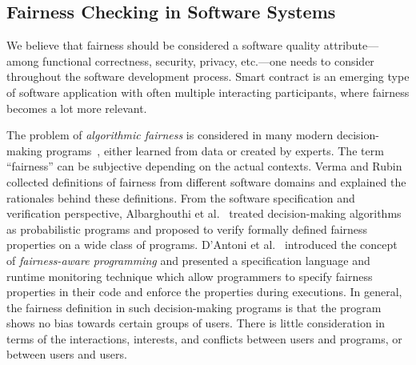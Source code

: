 
\subsection{Fairness Checking in Software Systems}

We believe that fairness should be considered a software quality attribute---among functional
correctness, security, privacy, etc.---one needs to consider throughout the software development
process.
Smart contract is an emerging type of software application with often multiple interacting
participants, where fairness becomes a lot more relevant.

The problem of \emph{algorithmic fairness} is considered in many modern decision-making
programs~\cite{zemel2013learning,datta2016algorithmic,Albarghouthi2017FairSquarePV}, either learned
from data or created by experts.
The term ``fairness'' can be subjective depending on the actual contexts.
Verma and Rubin~\cite{VR18} collected definitions of fairness from different software domains and
explained the rationales behind these definitions.
From the software specification and verification perspective, Albarghouthi et
al.~\cite{Albarghouthi2017FairSquarePV} treated decision-making algorithms as probabilistic programs
and proposed to verify formally defined fairness properties on a wide class of programs.
D'Antoni et al.~\cite{Albarghouthi2019FairnessAwareP} introduced the concept of
\emph{fairness-aware programming} and presented a specification language and runtime monitoring
technique which allow programmers to specify fairness properties in their code and enforce the
properties during executions.
In general, the fairness definition in such decision-making programs is that the program shows no
bias towards certain groups of users.
There is little consideration in terms of the interactions, interests, and conflicts between
users and programs, or between users and users.

